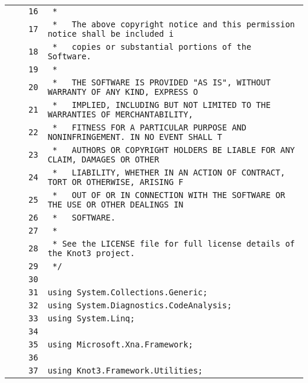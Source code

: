 \documentclass[a4paper,10pt]{article}
\begin{document}
\begin{longtable}[l]{lrrl}
\cellcolor{gray} &  & \verb~16~ & \verb~ *~\\
\cellcolor{gray} &  & \verb~17~ & \verb~ *   The above copyright notice and this permission notice shall be included i~\\
\cellcolor{gray} &  & \verb~18~ & \verb~ *   copies or substantial portions of the Software.~\\
\cellcolor{gray} &  & \verb~19~ & \verb~ *~\\
\cellcolor{gray} &  & \verb~20~ & \verb~ *   THE SOFTWARE IS PROVIDED "AS IS", WITHOUT WARRANTY OF ANY KIND, EXPRESS O~\\
\cellcolor{gray} &  & \verb~21~ & \verb~ *   IMPLIED, INCLUDING BUT NOT LIMITED TO THE WARRANTIES OF MERCHANTABILITY,~\\
\cellcolor{gray} &  & \verb~22~ & \verb~ *   FITNESS FOR A PARTICULAR PURPOSE AND NONINFRINGEMENT. IN NO EVENT SHALL T~\\
\cellcolor{gray} &  & \verb~23~ & \verb~ *   AUTHORS OR COPYRIGHT HOLDERS BE LIABLE FOR ANY CLAIM, DAMAGES OR OTHER~\\
\cellcolor{gray} &  & \verb~24~ & \verb~ *   LIABILITY, WHETHER IN AN ACTION OF CONTRACT, TORT OR OTHERWISE, ARISING F~\\
\cellcolor{gray} &  & \verb~25~ & \verb~ *   OUT OF OR IN CONNECTION WITH THE SOFTWARE OR THE USE OR OTHER DEALINGS IN~\\
\cellcolor{gray} &  & \verb~26~ & \verb~ *   SOFTWARE.~\\
\cellcolor{gray} &  & \verb~27~ & \verb~ *~\\
\cellcolor{gray} &  & \verb~28~ & \verb~ * See the LICENSE file for full license details of the Knot3 project.~\\
\cellcolor{gray} &  & \verb~29~ & \verb~ */~\\
\cellcolor{gray} &  & \verb~30~ & \verb~~\\
\cellcolor{gray} &  & \verb~31~ & \verb~using System.Collections.Generic;~\\
\cellcolor{gray} &  & \verb~32~ & \verb~using System.Diagnostics.CodeAnalysis;~\\
\cellcolor{gray} &  & \verb~33~ & \verb~using System.Linq;~\\
\cellcolor{gray} &  & \verb~34~ & \verb~~\\
\cellcolor{gray} &  & \verb~35~ & \verb~using Microsoft.Xna.Framework;~\\
\cellcolor{gray} &  & \verb~36~ & \verb~~\\
\cellcolor{gray} &  & \verb~37~ & \verb~using Knot3.Framework.Utilities;~\\

\end{longtable}
\end{document}
